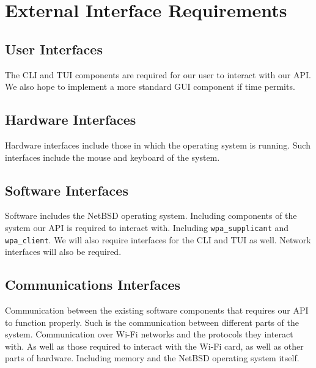 \section{External Interface Requirements}

\subsection{User Interfaces}

The CLI and TUI components are required for our user to interact with our API. We 
also hope to implement a more standard GUI component if time permits. 

\subsection{Hardware Interfaces}

Hardware interfaces include those in which the operating system is running. Such 
interfaces include the mouse and keyboard of the system. 

\subsection{Software Interfaces}

Software includes the NetBSD operating system. Including components of the system our API is 
required to interact with. Including \texttt{wpa\_supplicant} and \texttt{wpa\_client}. We will 
also require interfaces for the CLI and TUI as well. Network interfaces will also be required. 

\subsection{Communications Interfaces}

Communication between the existing software components that requires our API to function properly. 
Such is the communication between different parts of the system. Communication over Wi-Fi networks 
and the protocols they interact with. As well as those required to interact with the Wi-Fi card, as 
well as other parts of hardware. Including memory and the NetBSD operating system itself. 